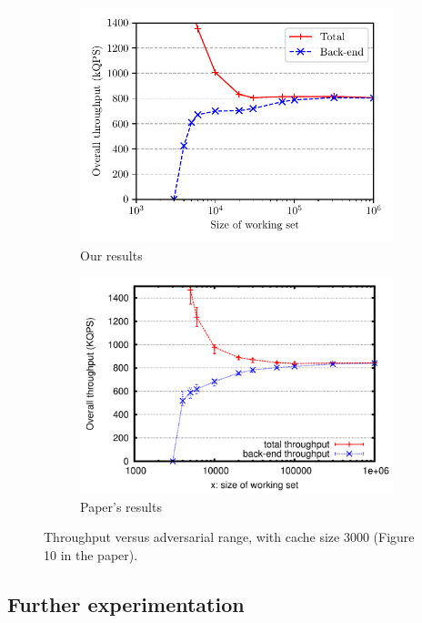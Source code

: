 \documentclass[10pt,letterpaper]{article}
\begin{document}
\begin{figure}[h]
\centering
\begin{subfigure}[t]{.47\textwidth}
	\centering	
	\includegraphics[scale=0.73]{img/throughput_vs_working_set.pdf}
	\caption{Our results}
\end{subfigure}\hfill
\begin{subfigure}[t]{.47\textwidth}
	\centering
	\includegraphics[scale=0.2]{img/throughput_vs_working_set_paper.png}
	\caption{Paper's results}
\end{subfigure}
\caption{Throughput versus adversarial range, with cache size $3000$ (Figure 10 in the paper).}
\label{fig:throughput_vs_working_set}
\end{figure}

\subsection{Further experimentation}
\end{document}
